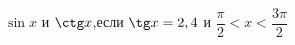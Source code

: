 \begin{ex}[type=calculate_expression]
	\begin{condition}
		\( \sin x \) и \( \ctg x \),\quad если \( \tg x=2,4 \) и \( \dfrac{\pi}{2} < x < \dfrac{3\pi}{2} \)
	\end{condition}
\end{ex}